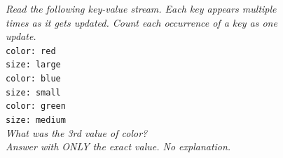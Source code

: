 \documentclass[letterpaper]{article} %
\begin{document}
\begin{figure}[h]
\small
\centering
\begin{minipage}[t]{0.48\textwidth}
\begin{tcolorbox}[
    colframe=black!30, colback=gray!4,
    boxrule=0.5pt, arc=2pt,
    left=6pt, right=6pt, top=4pt, bottom=4pt,
    equal height group=fmts,
    title={\textbf{Plain} (\texttt{flat\_nolabel}; default in \S4)},
    fonttitle=\small\bfseries,
    coltitle=black]
\emph{Read the following key-value stream. Each key appears
multiple times as it gets updated. Count each occurrence of a key as
one update.}\\[4pt]
\texttt{color: red}\\
\texttt{size: large}\\
\texttt{color: blue}\\
\texttt{size: small}\\
\texttt{color: green}\\
\texttt{size: medium}\\[4pt]
\emph{What was the 3rd value of color?}\\
\emph{Answer with ONLY the exact value. No explanation.}
\end{tcolorbox}


\end{minipage}
\end{figure}
\end{document}
